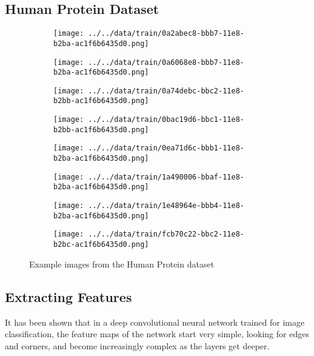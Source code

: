 \documentclass{article}
\begin{document}
\subsection{Human Protein Dataset}
\begin{figure}[h!]
    \centering
    \begin{subfigure}[b]{0.2\linewidth}
      \texttt{[image: ../../data/train/0a2abec8-bbb7-11e8-b2ba-ac1f6b6435d0.png]}
    \end{subfigure}
    \begin{subfigure}[b]{0.2\linewidth}
      \texttt{[image: ../../data/train/0a6068e8-bbb7-11e8-b2ba-ac1f6b6435d0.png]}
    \end{subfigure}
    \begin{subfigure}[b]{0.2\linewidth}
        \texttt{[image: ../../data/train/0a74debc-bbc2-11e8-b2bb-ac1f6b6435d0.png]}
    \end{subfigure}
    \begin{subfigure}[b]{0.2\linewidth}
        \texttt{[image: ../../data/train/0bac19d6-bbc1-11e8-b2bb-ac1f6b6435d0.png]}
    \end{subfigure}

    \begin{subfigure}[b]{0.2\linewidth}
        \texttt{[image: ../../data/train/0ea71d6c-bbb1-11e8-b2ba-ac1f6b6435d0.png]}
      \end{subfigure}
      \begin{subfigure}[b]{0.2\linewidth}
        \texttt{[image: ../../data/train/1a490006-bbaf-11e8-b2ba-ac1f6b6435d0.png]}
      \end{subfigure}
      \begin{subfigure}[b]{0.2\linewidth}
          \texttt{[image: ../../data/train/1e48964e-bbb4-11e8-b2ba-ac1f6b6435d0.png]}
      \end{subfigure}
      \begin{subfigure}[b]{0.2\linewidth}
          \texttt{[image: ../../data/train/fcb70c22-bbc2-11e8-b2bc-ac1f6b6435d0.png]}
      \end{subfigure}
    \caption{Example images from the Human Protein dataset}
    \label{fig:coffee}
  \end{figure}
\subsection{Extracting Features}
It has been shown that in a deep convolutional neural network trained for image classification, the
feature maps of the network start very simple, looking for edges and corners, and become increasingly
complex as the layers get deeper. 
\end{document}
